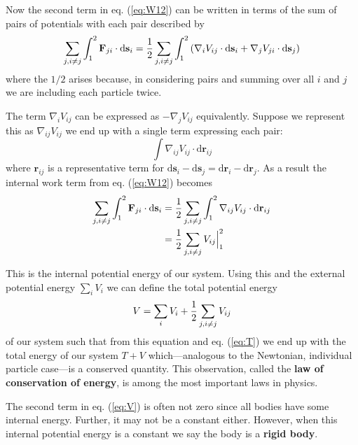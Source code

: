 \documentclass[english,seminar,headertitle]{lecture}
\begin{document}
Now the second term in eq. (\ref{eq:W12}) can be written in terms of the sum of pairs of potentials with each pair described by
$$
\sum_{j, i\neq j}\int_1^2 \mathbf{F}_{ji}\cdot\textrm{d}\mathbf{s}_i = {1\over 2} \sum_{j, i \neq j} \int_1^2 \left( \nabla_i V_{ij} \cdot \textrm{d}\mathbf{s}_i + \nabla_j V_{ji} \cdot \textrm{d}\mathbf{s}_j \right)
$$
where the $1/2$ arises because, in considering pairs and summing over all $i$ and $j$ we are including each particle twice.

The term $\nabla_i V_{ij}$ can be expressed as $-\nabla_j V_{ij}$ equivalently. Suppose we represent this as $\nabla_{ij} V_{ij}$ we end up with a single term expressing each pair:
$$
\int \nabla_{ij} V_{ij} \cdot \textrm{d}\mathbf{r}_{ij}
$$
where $\mathbf{r}_{ij}$ is a representative term for $\textrm{d}\mathbf{s}_i - \textrm{d}\mathbf{s}_j = \textrm{d}\mathbf{r}_i - \textrm{d}\mathbf{r}_j$. As a result the internal work term from eq. (\ref{eq:W12}) becomes
\begin{align*}
\sum_{j, i\neq j}\int_1^2 \mathbf{F}_{ji}\cdot\textrm{d}\mathbf{s}_i &= {1\over 2} \sum_{j, i \neq j} \int_1^2 \nabla_{ij} V_{ij} \cdot \textrm{d}\mathbf{r}_{ij} \\
&= {1 \over 2} \sum_{j, i \neq j} V_{ij} \Bigr|_1^2
\end{align*}%

This is the internal potential energy of our system. Using this and the external potential energy $\sum_i V_i$ we can define the total potential energy
\begin{equation}
	V = \sum_i V_i + {1 \over 2} \sum_{j, i\neq j} V_{ij} \label{eq:V}
\end{equation}%
of our system such that from this equation and eq. (\ref{eq:T}) we end up with the total energy of our system $T+V$ which---analogous to the Newtonian, individual particle case---is a conserved quantity. This observation, called the \textbf{law of conservation of energy}, is among the most important laws in physics.

The second term in eq. (\ref{eq:V}) is often not zero since all bodies have some internal energy. Further, it may not be a constant either. However, when this internal potential energy is a constant we say the body is a \textbf{rigid body}.
\end{document}
